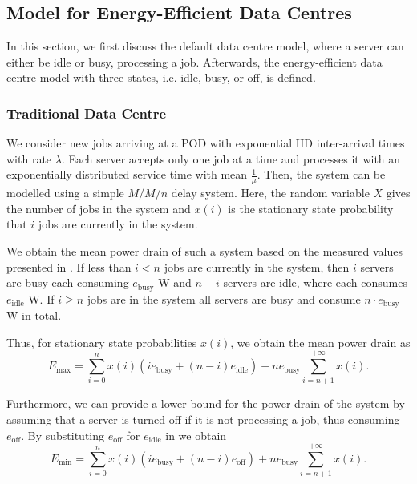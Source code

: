 \subsection{Model for Energy-Efficient Data Centres}\label{sec:cloud:data_centers:modeling}
In this section, we first discuss the default data centre model, where a server can either be idle or busy, processing a job. Afterwards, the energy-efficient data centre model with three states, i.e. idle, busy, or off, is defined.

\subsubsection*{Traditional Data Centre}\label{sec:cloud:data_centers:modeling:default}
We consider new jobs arriving at a \gls{POD} with exponential \gls{IID} inter-arrival times with rate \(\lambda\).
Each server accepts only one job at a time and processes it with an exponentially distributed service time with mean \(\frac{1}{\mu}\).
Then, the system can be modelled using a simple \(M/M/n\) delay system.
Here, the random variable \(X\) gives the number of jobs in the system and \(x(i)\) is the stationary state probability that \(i\) jobs are currently in the system.

We obtain the mean power drain of such a system based on the measured values presented in .
If less than \(i < n\) jobs are currently in the system, then \(i\) servers are busy each consuming \(e_\text{busy}\) \si{\watt} and \(n-i\) servers are idle, where each consumes \(e_\text{idle}\) \si{\watt}.
If \(i \geq n\) jobs are in the system all servers are busy and consume \(n\cdot e_\text{busy}\) \si{\watt} in total.

Thus, for stationary state probabilities \(x(i)\), we obtain the mean power drain as
\begin{equation}\label{sec:cloud:data_centers:modeling:default:emax}
E_\text{max} = \sum_{i=0}^{n} x(i) (i e_\text{busy} + (n-i) e_\text{idle}) + ne_\text{busy} \sum_{i=n + 1}^{+ \infty} x(i).
\end{equation}

Furthermore, we can provide a lower bound for the power drain of the system by assuming that a server is turned off if it is not processing a job, thus consuming \(e_\text{off}\).
By substituting \(e_\text{off}\) for \(e_\text{idle}\) in  we obtain
\begin{equation*}
E_\text{min} = \sum_{i=0}^{n} x(i) (i e_\text{busy} + (n-i) e_\text{off}) + ne_\text{busy} \sum_{i=n + 1}^{+ \infty} x(i).
\end{equation*}

